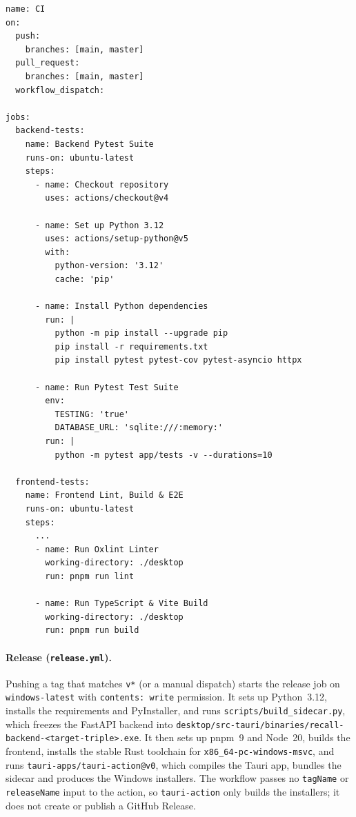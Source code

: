 \begin{lstlisting}[caption={Excerpt of \texttt{.github/workflows/ci.yml}},label={lst:ci}]
name: CI
on:
  push:
    branches: [main, master]
  pull_request:
    branches: [main, master]
  workflow_dispatch:

jobs:
  backend-tests:
    name: Backend Pytest Suite
    runs-on: ubuntu-latest
    steps:
      - name: Checkout repository
        uses: actions/checkout@v4

      - name: Set up Python 3.12
        uses: actions/setup-python@v5
        with:
          python-version: '3.12'
          cache: 'pip'

      - name: Install Python dependencies
        run: |
          python -m pip install --upgrade pip
          pip install -r requirements.txt
          pip install pytest pytest-cov pytest-asyncio httpx

      - name: Run Pytest Test Suite
        env:
          TESTING: 'true'
          DATABASE_URL: 'sqlite:///:memory:'
        run: |
          python -m pytest app/tests -v --durations=10

  frontend-tests:
    name: Frontend Lint, Build & E2E
    runs-on: ubuntu-latest
    steps:
      ...
      - name: Run Oxlint Linter
        working-directory: ./desktop
        run: pnpm run lint

      - name: Run TypeScript & Vite Build
        working-directory: ./desktop
        run: pnpm run build
\end{lstlisting}

\paragraph{Release (\texttt{release.yml}).}
Pushing a tag that matches \texttt{v*} (or a manual dispatch) starts the release job on
\texttt{windows-latest} with \texttt{contents: write} permission. It sets up
Python~3.12, installs the requirements and PyInstaller, and runs
\texttt{scripts/build\_sidecar.py}, which freezes the FastAPI backend into
\texttt{desktop/src-tauri/binaries/recall-backend-<target-triple>.exe}. It then sets up
pnpm~9 and Node~20, builds the frontend, installs the stable Rust toolchain for
\texttt{x86\_64-pc-windows-msvc}, and runs \texttt{tauri-apps/tauri-action@v0}, which
compiles the Tauri app, bundles the sidecar and produces the Windows installers. The
workflow passes no \texttt{tagName} or \texttt{releaseName} input to the action, so
\texttt{tauri-action} only builds the installers; it does not create or publish a GitHub
Release.

